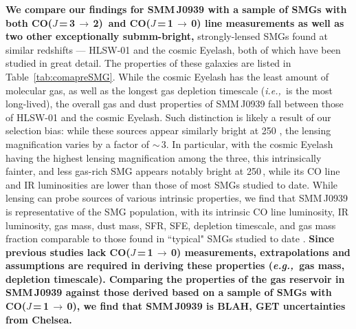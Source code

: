 \documentclass[iop, revtex4]{emulateapj}
\newcommand{\rarr}{$\rightarrow$}
\newcommand{\CO}{\mbox{CO($J$\,=\,3\,$\rightarrow$\,2) }}
\newcommand{\rot}[3][CO]{\mbox{#1($J$\,=\,#2\,\rarr\,#3)}}
\newcommand{\eg}{{\sl e.g.,~}}
\newcommand{\ie}{{\sl i.e.,~}}
\begin{document}
{\bf We
compare our findings for SMM\,J0939 
with a sample of SMGs with both \CO and \rot{1}{0} line measurements as well as 
 two other exceptionally submm-bright,}
strongly-lensed SMGs
found at similar redshifts --- HLSW-01 and the cosmic Eyelash, both of which have been studied in great detail.
 The properties
of these galaxies are listed in Table~\ref{tab:comapreSMG}. While the cosmic Eyelash has the least amount of molecular gas, as well as
the
longest gas depletion timescale (\ie is the most long-lived), the overall gas and dust properties of SMM\,J0939 fall between those of HLSW-01 and the
cosmic
Eyelash. Such distinction is likely a result of our selection bias: while these sources appear similarly bright at 250 \micron, the lensing magnification
varies by a factor of $\sim$\,3. In particular, with the cosmic Eyelash having the highest lensing magnification among the
three, this
intrinsically fainter, and less gas-rich SMG appears notably bright
at 250\,\micron, while its CO line and IR luminosities are lower than those of most SMGs studied to date.
While lensing can probe sources
of various intrinsic properties, we find that SMM\,J0939 is representative of the SMG population, with its intrinsic CO line luminosity, IR luminosity, gas mass,
dust mass, SFR, SFE, depletion timescale, and gas mass fraction comparable to those found in ``typical" SMGs studied to date
\citep[\eg ][]{Greve05a,Tacconi08a}. 
{\bf Since previous studies lack \rot{1}{0} measurements, extrapolations and assumptions are required in deriving these properties (\eg gas mass, depletion timescale). Comparing the properties of the gas reservoir in SMM\,J0939 against those derived based on a sample of SMGs with \rot{1}{0}, we find that SMM\,J0939 is BLAH, GET uncertainties from Chelsea.
}
\end{document}
